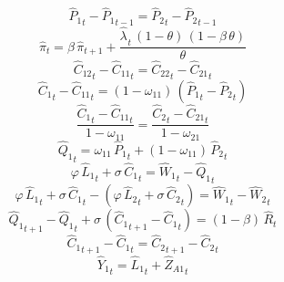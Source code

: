 \begin{dmath}
{{\hat{P}_{1}}}_{t}-{{\hat{P}_{1}}}_{t-1}={{\hat{P}_{2}}}_{t}-{{\hat{P}_{2}}}_{t-1}
\end{dmath}
\begin{dmath}
{{\hat{\pi}}}_{t}={{\beta}}\, {{\hat{\pi}}}_{t+1}+\frac{{{\hat{\lambda}_{}}}_{t}\, \left(1-{{\theta}}\right)\, \left(1-{{\beta}}\, {{\theta}}\right)}{{{\theta}}}
\end{dmath}
\begin{dmath}
{{\hat{C}_{1 2}}}_{t}-{{\hat{C}_{1 1}}}_{t}={{\hat{C}_{2 2}}}_{t}-{{\hat{C}_{2 1}}}_{t}
\end{dmath}
\begin{dmath}
{{\hat{C}_{1}}}_{t}-{{\hat{C}_{1 1}}}_{t}=\left(1-{{\omega_{11}}}\right)\, \left({{\hat{P}_{1}}}_{t}-{{\hat{P}_{2}}}_{t}\right)
\end{dmath}
\begin{dmath}
\frac{{{\hat{C}_{1}}}_{t}-{{\hat{C}_{1 1}}}_{t}}{1-{{\omega_{11}}}}=\frac{{{\hat{C}_{2}}}_{t}-{{\hat{C}_{2 1}}}_{t}}{1-{{\omega_{21}}}}
\end{dmath}
\begin{dmath}
{{\hat{Q}_{1}}}_{t}={{\omega_{11}}}\, {{\hat{P}_{1}}}_{t}+\left(1-{{\omega_{11}}}\right)\, {{\hat{P}_{2}}}_{t}
\end{dmath}
\begin{dmath}
{{\varphi}}\, {{\hat{L}_{1}}}_{t}+{{\sigma}}\, {{\hat{C}_{1}}}_{t}={{\hat{W}_{1}}}_{t}-{{\hat{Q}_{1}}}_{t}
\end{dmath}
\begin{dmath}
{{\varphi}}\, {{\hat{L}_{1}}}_{t}+{{\sigma}}\, {{\hat{C}_{1}}}_{t}-\left({{\varphi}}\, {{\hat{L}_{2}}}_{t}+{{\sigma}}\, {{\hat{C}_{2}}}_{t}\right)={{\hat{W}_{1}}}_{t}-{{\hat{W}_{2}}}_{t}
\end{dmath}
\begin{dmath}
{{\hat{Q}_{1}}}_{t+1}-{{\hat{Q}_{1}}}_{t}+{{\sigma}}\, \left({{\hat{C}_{1}}}_{t+1}-{{\hat{C}_{1}}}_{t}\right)=\left(1-{{\beta}}\right)\, {{\hat{R}}}_{t}
\end{dmath}
\begin{dmath}
{{\hat{C}_{1}}}_{t+1}-{{\hat{C}_{1}}}_{t}={{\hat{C}_{2}}}_{t+1}-{{\hat{C}_{2}}}_{t}
\end{dmath}
\begin{dmath}
{{\hat{Y}_{1}}}_{t}={{\hat{L}_{1}}}_{t}+{{\hat{Z}_{A1}}}_{t}
\end{dmath}
